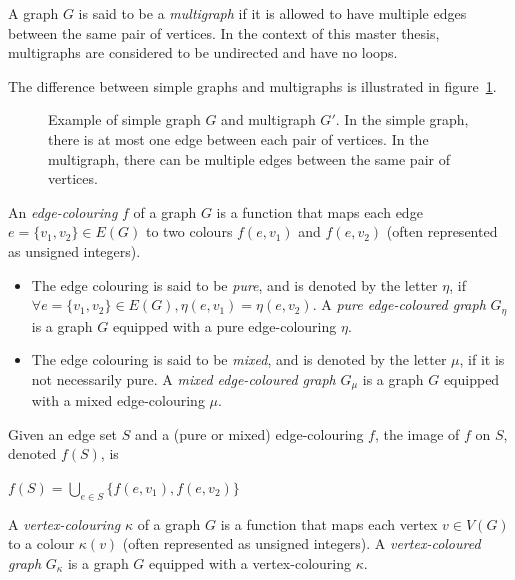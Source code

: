 \begin{definition}[Multigraph]
    \label{def:multigraph}
    A graph $G$ is said to be a \textit{multigraph} if it is allowed to have multiple edges between the same pair of vertices.
    In the context of this master thesis, multigraphs are considered to be undirected and have no loops.
\end{definition}

The difference between simple graphs and multigraphs is illustrated in figure~\ref{fig:simple_vs_multigraph}.
\begin{figure}[H]
    \caption{Example of simple graph $G$ and multigraph $G'$. In the simple graph, there is at most one edge between each pair of vertices. In the multigraph, there can be multiple edges between the same pair of vertices.}
    \label{fig:simple_vs_multigraph}
\end{figure}

\begin{definition}
    \label{def:edge-coloured-graph}
    An \textit{edge-colouring} $f$ of a graph $G$ is a function that maps each edge $e = \{v_1, v_2\} \in E(G)$ to two colours $f(e, v_1)$ and $f(e, v_2)$ (often represented as unsigned integers).
    \begin{itemize}
        \item The edge colouring is said to be \textit{pure}, and is denoted by the letter $\eta$, if $\forall e = \{v_1, v_2\} \in E(G), \eta(e, v_1) = \eta(e, v_2)$.
            A \textit{pure edge-coloured graph} $G_\eta$ is a graph $G$ equipped with a pure edge-colouring $\eta$.
        \item The edge colouring is said to be \textit{mixed}, and is denoted by the letter $\mu$, if it is not necessarily pure.
            A \textit{mixed edge-coloured graph} $G_\mu$ is a graph $G$ equipped with a mixed edge-colouring $\mu$.
    \end{itemize}
    Given an edge set $S$ and a (pure or mixed) edge-colouring $f$, the image of $f$ on $S$, denoted $f(S)$, is
    \begin{center}
        $f(S) = \bigcup\limits_{e \in S} \{f(e, v_1), f(e, v_2)\}$
    \end{center}
\end{definition}

\begin{definition}
    \label{def:vertex_coloured_graph}
    A \textit{vertex-colouring} $\kappa$ of a graph $G$ is a function that maps each vertex $v \in V(G)$ to a colour $\kappa(v)$ (often represented as unsigned integers).
    A \textit{vertex-coloured graph} $G_\kappa$ is a graph $G$ equipped with a vertex-colouring $\kappa$.
\end{definition}

